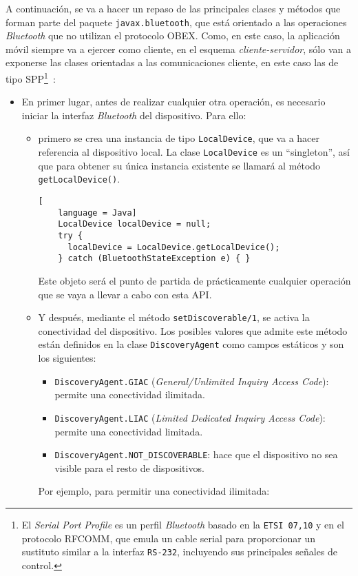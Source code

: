 A continuación, se va a hacer un repaso de las principales clases y métodos
que forman parte del paquete \texttt{javax.bluetooth}, que está orientado a 
las operaciones \emph{Bluetooth} que no utilizan el protocolo \acs{OBEX}.
Como, en este caso, la aplicación móvil siempre va a ejercer como 
cliente, en el esquema \emph{cliente-servidor}, sólo van a exponerse las
clases orientadas a las comunicaciones cliente, en este caso las de tipo
\acs{SPP}\footnote{El \emph{Serial Port Profile} es un perfil \emph{Bluetooth} 
basado en la \texttt{\acs{ETSI} 07,10} y en el protocolo \acs{RFCOMM}, que
emula un cable serial para proporcionar un sustituto similar a la interfaz
\texttt{RS-232}, incluyendo sus principales señales de
control.}~\cite{bib:jsr82}:
\begin{itemize}
\item En primer lugar, antes de realizar cualquier otra operación, es necesario
iniciar la interfaz \emph{Bluetooth} del dispositivo. Para ello:
  \begin{itemize}
  \item primero se crea una instancia de tipo \texttt{LocalDevice}, que va a 
  hacer referencia al dispositivo local. La clase \texttt{LocalDevice} es un 
  ``singleton'', así que para obtener su única instancia existente se llamará 
  al método \texttt{getLocalDevice()}.

  \begin{lstlisting}[
    language = Java]
    LocalDevice localDevice = null;
    try {
      localDevice = LocalDevice.getLocalDevice();
    } catch (BluetoothStateException e) { }
  \end{lstlisting}

  Este objeto será el punto de partida de prácticamente cualquier operación
  que se vaya a llevar a cabo con esta \acs{API}.

  \item Y después, mediante el método \texttt{setDiscoverable/1}, se activa la 
  conectividad del dispositivo. Los posibles valores que admite este método
  están definidos en la clase \texttt{DiscoveryAgent} como campos estáticos y
  son los siguientes:
    \begin{itemize}
    \item \texttt{DiscoveryAgent.GIAC} (\emph{General/Unlimited Inquiry Access
    Code}): permite una conectividad ilimitada.
    \item \texttt{DiscoveryAgent.LIAC} (\emph{Limited Dedicated Inquiry Access
    Code}): permite una conectividad limitada.
    \item \texttt{DiscoveryAgent.NOT\_DISCOVERABLE}: hace que el dispositivo
    no sea visible para el resto de dispositivos.
    \end{itemize}
  Por ejemplo, para permitir una conectividad ilimitada:


\end{itemize}
\end{itemize}
